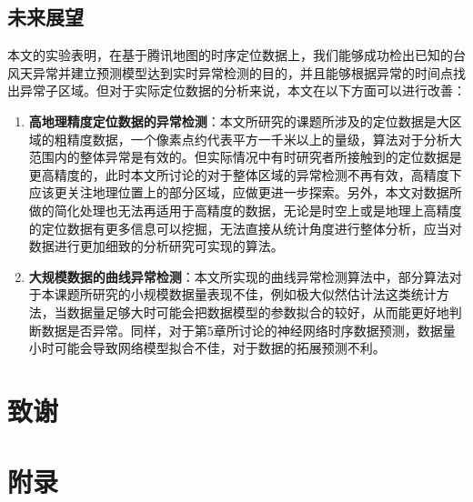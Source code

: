 \documentclass[a4paper,AutoFakeBold,oneside,12pt]{book}
\begin{document}
\section{未来展望}
本文的实验表明，在基于腾讯地图的时序定位数据上，我们能够成功检出已知的台风天异常并建立预测模型达到实时异常检测的目的，并且能够根据异常的时间点找出异常子区域。但对于实际定位数据的分析来说，本文在以下方面可以进行改善：
\begin{enumerate}
\item \textbf{高地理精度定位数据的异常检测}：本文所研究的课题所涉及的定位数据是大区域的粗精度数据，一个像素点约代表平方一千米以上的量级，算法对于分析大范围内的整体异常是有效的。但实际情况中有时研究者所接触到的定位数据是更高精度的，此时本文所讨论的对于整体区域的异常检测不再有效，高精度下应该更关注地理位置上的部分区域，应做更进一步探索。另外，本文对数据所做的简化处理也无法再适用于高精度的数据，无论是时空上或是地理上高精度的定位数据有更多信息可以挖掘，无法直接从统计角度进行整体分析，应当对数据进行更加细致的分析研究可实现的算法。
\item \textbf{大规模数据的曲线异常检测}：本文所实现的曲线异常检测算法中，部分算法对于本课题所研究的小规模数据量表现不佳，例如极大似然估计法这类统计方法，当数据量足够大时可能会把数据模型的参数拟合的较好，从而能更好地判断数据是否异常。同样，对于第5章所讨论的神经网络时序数据预测，数据量小时可能会导致网络模型拟合不佳，对于数据的拓展预测不利。
\end{enumerate}



\clearpage{}


\clearpage{}
\chapter*{致\qquad{}谢}
\normalsize\thankwords

\setcounter{figure}{0} 
\renewcommand{\thefigure}{~附-\arabic{figure}~}
\setcounter{equation}{0} 
\renewcommand{\theequation}{~附-\arabic{equation}~}
\setcounter{table}{0} 
\renewcommand{\thetable}{~附-\arabic{table}~}

\chapter*{附\qquad{}录}
\end{document}
